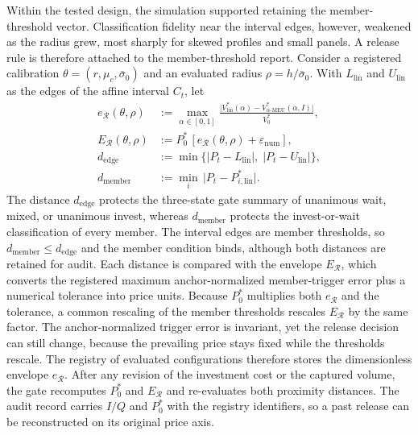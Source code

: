 \documentclass[5p,times,authoryear]{elsarticle}
\theoremstyle{plain}
\newcommand{\sbar}{\bar{\sigma}_0}
\newcommand{\Vzero}{V^{*}_{0}}
\newcommand{\Vlin}{V^{*}_{\mathrm{lin}}}
\newcommand{\VMEU}{V^{*}_{\alpha\text{-MEU}}}
\newcommand{\ER}{E_{\mathcal{R}}}
\newcommand{\eR}{e_{\mathcal{R}}}
\newcommand{\dedge}{d_{\mathrm{edge}}}
\newcommand{\dmember}{d_{\mathrm{member}}}
\begin{document}
Within the tested design, the simulation supported retaining the member-threshold vector. Classification fidelity near the interval edges, however, weakened as the radius grew, most sharply for skewed profiles and small panels. A release rule is therefore attached to the member-threshold report. Consider a registered calibration $\theta=(r,\mu_c,\sbar)$ and an evaluated radius $\rho=h/\sbar$. With $L_{\mathrm{lin}}$ and $U_{\mathrm{lin}}$ as the edges of the affine interval $C_t$, let
\begin{equation}
\begin{aligned}
\eR(\theta,\rho)&:=\max_{\alpha\in[0,1]}\frac{\lvert\Vlin(\alpha)-\VMEU(\alpha,I)\rvert}{\Vzero},\\
\ER(\theta,\rho)&:=P^{*}_{0}\,[\eR(\theta,\rho)+\varepsilon_{\mathrm{num}}],\\
\dedge&:=\min\{\lvert P_t-L_{\mathrm{lin}}\rvert,\;\lvert P_t-U_{\mathrm{lin}}\rvert\},\\
\dmember&:=\min_i\,\lvert P_t-P^{*}_{i,\mathrm{lin}}\rvert.
\end{aligned}
\label{eq:safeguard}
\end{equation}
The distance $\dedge$ protects the three-state gate summary of unanimous wait, mixed, or unanimous invest, whereas $\dmember$ protects the invest-or-wait classification of every member. The interval edges are member thresholds, so $\dmember\le\dedge$ and the member condition binds, although both distances are retained for audit. Each distance is compared with the envelope $\ER$, which converts the registered maximum anchor-normalized member-trigger error plus a numerical tolerance into price units. Because $P^{*}_{0}$ multiplies both $\eR$ and the tolerance, a common rescaling of the member thresholds rescales $\ER$ by the same factor. The anchor-normalized trigger error is invariant, yet the release decision can still change, because the prevailing price stays fixed while the thresholds rescale. The registry of evaluated configurations therefore stores the dimensionless envelope $\eR$. After any revision of the investment cost or the captured volume, the gate recomputes $P^{*}_{0}$ and $\ER$ and re-evaluates both proximity distances. The audit record carries $I/Q$ and $P^{*}_{0}$ with the registry identifiers, so a past release can be reconstructed on its original price axis.
\end{document}
